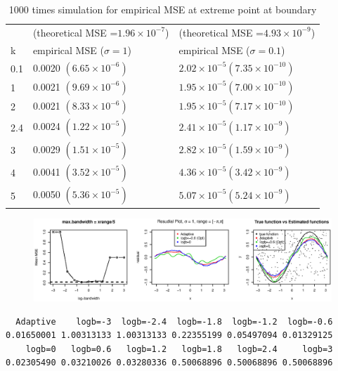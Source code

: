 \documentclass{article}
\begin{document}
\begin{itemize}
\begin{table}[H]
\centering
\begin{tabular}{l|l| l}
\hline\hline
& (theoretical MSE =$1.96\times 10^{-7}$) & (theoretical MSE =$4.93\times 10^{-9}$)\\
k & empirical MSE  ($\sigma=1$) &empirical MSE  ($\sigma=0.1$) \\\hline 
0.1&0.0020 $(6.65\times 10^{-6})$ & $2.02\times 10^{-5} (7.35\times 10^{-10})$\\
1 & 0.0021 $(9.69\times 10^{-6})$ & $1.95\times 10^{-5}  (7.00\times 10^{-10})$\\
2 & 0.0021 $(8.33\times 10^{-6})$ & $1.95\times 10^{-5} (7.17\times 10^{-10})$\\
2.4 & 0.0024 $(1.22\times 10^{-5})$ & $2.41\times 10^{-5} (1.17\times 10^{-9})$\\
3 & 0.0029 $(1.51\times 10^{-5})$ & $2.82\times 10^{-5} (1.59\times 10^{-9})$\\
4 & 0.0041 $(3.52\times 10^{-5})$ &  $4.36\times 10^{-5} (3.42\times 10^{-9})$\\
5 & 0.0050 $(5.36\times 10^{-5})$ &  $5.07\times 10^{-5} (5.24\times 10^{-9})$\\\hline
\end{tabular}
\caption{1000 times simulation for empirical MSE at extreme point at boundary}
\end{table}


\begin{figure}[H]
\includegraphics[width=\linewidth]{pic/sim.plot10.eps}
\end{figure}
\begin{verbatim}
  Adaptive    logb=-3  logb=-2.4  logb=-1.8  logb=-1.2  logb=-0.6 
0.01650001 1.00313133 1.00313133 0.22355199 0.05497094 0.01329125 
    logb=0   logb=0.6   logb=1.2   logb=1.8   logb=2.4     logb=3 
0.02305490 0.03210026 0.03280336 0.50068896 0.50068896 0.50068896
\end{verbatim}


\end{itemize}
\end{document}
